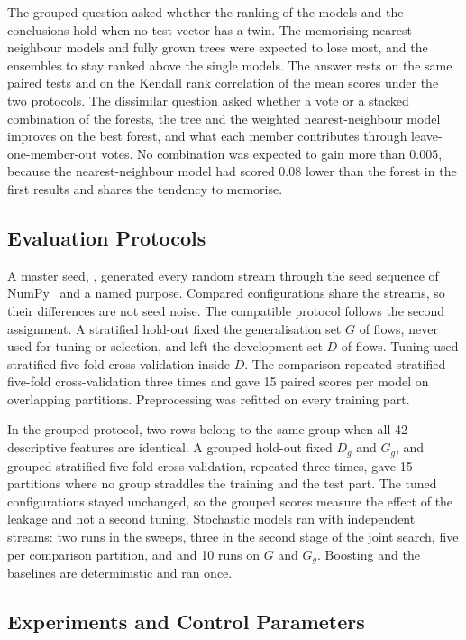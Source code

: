 \documentclass[10pt,conference]{IEEEtran}
\begin{document}
The grouped question asked whether the ranking of the models and the conclusions hold when no test vector has a twin. The memorising nearest-neighbour models and fully grown trees were expected to lose most, and the ensembles to stay ranked above the single models. The answer rests on the same paired tests and on the Kendall rank correlation of the mean scores under the two protocols. The dissimilar question asked whether a vote or a stacked combination of the forests, the tree and the weighted nearest-neighbour model improves on the best forest, and what each member contributes through leave-one-member-out votes. No combination was expected to gain more than 0.005, because the nearest-neighbour model had scored 0.08 lower than the forest in the first results and shares the tendency to memorise.

\subsection{Evaluation Protocols}
\label{sec:procedure-protocol}

A master seed, \masterSeed{}, generated every random stream through the seed sequence of NumPy~\cite{harris2020a} and a named purpose. Compared configurations share the streams, so their differences are not seed noise. The compatible protocol follows the second assignment. A stratified hold-out fixed the generalisation set $G$ of \nGen{} flows, never used for tuning or selection, and left the development set $D$ of \nDev{} flows. Tuning used stratified five-fold cross-validation inside $D$. The comparison repeated stratified five-fold cross-validation three times and gave 15 paired scores per model on overlapping partitions. Preprocessing was refitted on every training part.

In the grouped protocol, two rows belong to the same group when all 42 descriptive features are identical. A grouped hold-out fixed $D_{g}$ and $G_{g}$, and grouped stratified five-fold cross-validation, repeated three times, gave 15 partitions where no group straddles the training and the test part. The tuned configurations stayed unchanged, so the grouped scores measure the effect of the leakage and not a second tuning. Stochastic models ran with independent streams: two runs in the sweeps, three in the second stage of the joint search, five per comparison partition, and \OGCompRuns{} and 10 runs on $G$ and $G_{g}$. Boosting and the baselines are deterministic and ran once.

\subsection{Experiments and Control Parameters}
\label{sec:procedure-experiments}
\end{document}
